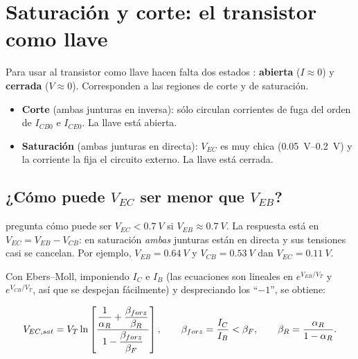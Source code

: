 \section{Saturación y corte: el transistor como llave}

Para usar al transistor como llave hacen falta dos estados : \textbf{abierta}
($I\approx0$) y \textbf{cerrada} ($V\approx0$). Corresponden a las regiones de corte y de
saturación.

\begin{itemize}
  \item \textbf{Corte} (ambas junturas en inversa): sólo circulan corrientes de fuga del
  orden de $I_{CB0}$ e $I_{CE0}$. La llave está abierta.
  \item \textbf{Saturación} (ambas junturas en directa): $V_{EC}$ es muy chica
  (\SIrange{0.05}{0.2}{V}) y la corriente la fija el circuito externo. La llave está cerrada.
\end{itemize}

\subsection{¿Cómo puede $V_{EC}$ ser menor que $V_{EB}$?}

 pregunta cómo puede ser $V_{EC}<\SI{0.7}{V}$ si $V_{EB}\approx\SI{0.7}{V}$. La
respuesta está en $V_{EC}=V_{EB}-V_{CB}$: en saturación \emph{ambas} junturas están en directa y
sus tensiones casi se cancelan. Por ejemplo, $V_{EB}=\SI{0.64}{V}$ y $V_{CB}=\SI{0.53}{V}$ dan
$V_{EC}=\SI{0.11}{V}$.

Con Ebers--Moll, imponiendo $I_C$ e $I_B$ (las ecuaciones son lineales en $e^{V_{EB}/V_T}$ y $e^{V_{CB}/V_T}$, así que se despejan fácilmente) y despreciando los ``$-1$'', se obtiene:

\begin{clave}
\[
  V_{EC,sat} = V_T\ln\left[\frac{\dfrac{1}{\alpha_R}+\dfrac{\beta_{forz}}{\beta_R}}
                               {1-\dfrac{\beta_{forz}}{\beta_F}}\right],
  \qquad
  \beta_{forz}=\frac{I_C}{I_B}<\beta_F,
  \qquad \beta_R=\frac{\alpha_R}{1-\alpha_R}.
\]
\end{clave}

